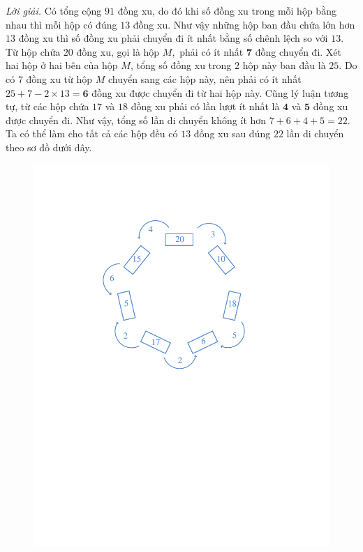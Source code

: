\begin{multicols}{2}
\begin{figure}[H]
		\vspace*{-5pt}
	\end{figure}
	\textit{Lời giải.}  Có tổng cộng $91$ đồng xu, do đó khi số đồng xu trong mỗi hộp bằng nhau thì mỗi hộp có đúng $13$ đồng xu. Như vậy những hộp ban đầu chứa lớn hơn $13$ đồng xu thì số đồng xu phải chuyển đi ít nhất bằng số chênh lệch so với $13$. Từ hộp chứa $20$ đồng xu, gọi là hộp $M,$ phải có ít nhất $\pmb{7}$ đồng chuyển đi. Xét hai hộp ở hai bên của hộp $M$, tổng số đồng xu trong $2$ hộp này ban đầu là $25$. Do có $7$ đồng xu từ hộp $M$ chuyển sang các hộp này, nên phải có ít nhất $25+ 7- 2\times 13= \pmb{6}$  đồng xu được chuyển đi từ hai hộp này.
	\vskip 0.1cm
	Cũng lý luận tương tự, từ các hộp chứa $17$ và $18$ đồng xu phải có lần lượt ít nhất là $\pmb{4}$ và $\pmb{5}$ đồng xu được chuyển đi. Như vậy, tổng số lần di chuyển không ít hơn $7+ 6 + 4 + 5 =22$.
	\vskip 0.1cm
	Ta có thể làm cho tất cả các hộp đều có $13$ đồng xu sau đúng $22$ lần di chuyển theo sơ đồ dưới đây. 
	\begin{figure}[H]
		\vspace*{-5pt}
		\centering
		\captionsetup{labelformat= empty, justification=centering}
		\includegraphics[width= 0.95\linewidth]{2a.pdf}

\end{figure}
\end{multicols}
